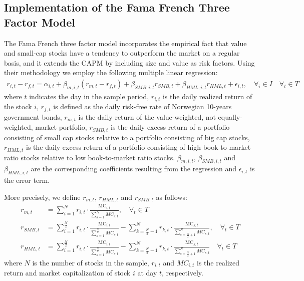 \subsection{Implementation of the Fama French Three Factor Model} The Fama French three factor model incorporates the empirical fact that value and small-cap stocks have a tendency to outperform the market on a regular basis, and it extends the CAPM by including size and value as risk factors. Using their methodology we employ the following multiple linear regression:
\begin{align} 
    r_{i,t} - r_{f,t}= \alpha_{i,t} + \beta_{m,i,t}(r_{m,t} - r_{f,t}) + \beta_{SMB,i,t}r_{SMB,t} + \beta_{HML,i,t}r_{HML,t} + \epsilon_{i,t}, \quad  \forall_i \in I \quad  \forall_t \in T 
    \label{FFregression}
\end{align}
where $t$ indicates the day in the sample period, $r_{i,t}$ is the daily realized return of the stock $i$, $r_{f,t}$ is defined as the daily risk-free rate of Norwegian 10-years government bonds, $r_{m,t}$ is the daily return of the value-weighted, not equally-weighted, market portfolio, $r_{SMB,t}$ is the daily excess return of a portfolio consisting of small cap stocks relative to a portfolio consisting of big cap stocks, $r_{HML,t}$ is the daily excess return of a portfolio consisting of high book-to-market ratio stocks relative to low book-to-market ratio stocks. $\beta_{m,i,t}$, $\beta_{SMB,i,t}$ and $\beta_{HML,i,t}$ are the corresponding coefficients resulting from the regression and $\epsilon_{i,t}$ is the error term.

More precisely, we define $r_{m,t}$, $r_{HML,t}$ and $r_{SMB,t}$ as follows:
\begin{align}
    r_{m,t} &= \sum_{i=1}^{N} r_{i,t} \cdot \frac{\text{MC}_{i,t}}{\sum_{s=1}^{N} MC_{s,t}},  \quad  \forall_t \in T \\
    r_{SMB,t} &= \sum_{i=1}^{\frac{N}{2}} r_{i,t} \cdot \frac{\text{MC}_{i,t}}{\sum_{s=1}^{\frac{N}{2}} MC_{s,t}} - \sum_{k=\frac{N}{2}+1}^{N} r_{k,t} \cdot \frac{\text{MC}_{k,t}}{\sum_{s={\frac{N}{2}+1}}^{N} MC_{s,t}}, \quad  \forall_t \in T \\
    r_{HML,t} &= \sum_{i=1}^{\frac{N}{2}} r_{i,t} \cdot \frac{\text{MC}_{i,t}}{\sum_{s=1}^{\frac{N}{2}} MC_{s,t}} - \sum_{k=\frac{N}{2}+1}^{N} r_{k,t} \cdot \frac{\text{MC}_{k,t}}{\sum_{s=\frac{N}{2}+1}^{N} MC_{s,t}} \quad  \forall_t \in T
\end{align}
where $N$ is the number of stocks in the sample, $r_{i,t}$ and $MC_{i,t}$ is the realized return and market capitalization of stock $i$ at day $t$, respectively. 

